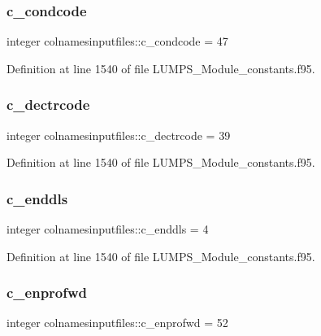 \subsubsection{\texorpdfstring{c\+\_\+condcode}{c\_condcode}}
{\footnotesize\ttfamily integer colnamesinputfiles\+::c\+\_\+condcode = 47}



Definition at line 1540 of file L\+U\+M\+P\+S\+\_\+\+Module\+\_\+constants.\+f95.

\mbox{\label{namespacecolnamesinputfiles_a2ad32fd4b205fb9b641e07196a382951}} 
\subsubsection{\texorpdfstring{c\+\_\+dectrcode}{c\_dectrcode}}
{\footnotesize\ttfamily integer colnamesinputfiles\+::c\+\_\+dectrcode = 39}



Definition at line 1540 of file L\+U\+M\+P\+S\+\_\+\+Module\+\_\+constants.\+f95.

\mbox{\label{namespacecolnamesinputfiles_af8181e64694030ff21479a0517c9e34c}} 
\subsubsection{\texorpdfstring{c\+\_\+enddls}{c\_enddls}}
{\footnotesize\ttfamily integer colnamesinputfiles\+::c\+\_\+enddls = 4}



Definition at line 1540 of file L\+U\+M\+P\+S\+\_\+\+Module\+\_\+constants.\+f95.

\mbox{\label{namespacecolnamesinputfiles_a30f510fdf83f7dfd68c79200fc219f72}} 
\subsubsection{\texorpdfstring{c\+\_\+enprofwd}{c\_enprofwd}}
{\footnotesize\ttfamily integer colnamesinputfiles\+::c\+\_\+enprofwd = 52}



